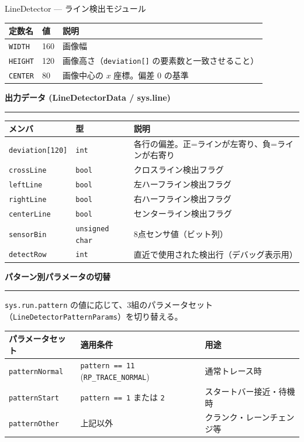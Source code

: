 \documentclass[a4paper,11pt,dvipdfmx]{jsarticle}
\makeatletter
\newcommand{\apisection}[1]{%
  \par\addvspace{4mm}%
  {\normalsize\bfseries\color{headerblue} #1}%
  \par\vspace{-1mm}%
  {\color{accentblue!40}\rule{\linewidth}{0.5pt}}%
  \par\nobreak\vspace{2mm}%
  \@afterheading
}
\makeatother
\begin{document}
\begin{apibox}{LineDetector --- ライン検出モジュール}
\begin{tabularx}{\textwidth}{l l X}
\toprule
\textbf{定数名} & \textbf{値} & \textbf{説明} \\
\midrule
\texttt{WIDTH}  & 160 & 画像幅 \\
\texttt{HEIGHT} & 120 & 画像高さ（\texttt{deviation[]} の要素数と一致させること） \\
\texttt{CENTER} & 80  & 画像中心の $x$ 座標。偏差 0 の基準 \\
\bottomrule
\end{tabularx}

\apisection{出力データ (LineDetectorData / sys.line)}

\begin{tabularx}{\textwidth}{l l X}
\toprule
\textbf{メンバ} & \textbf{型} & \textbf{説明} \\
\midrule
\texttt{deviation[120]} & \texttt{int}  & 各行の偏差。正=ラインが左寄り、負=ラインが右寄り \\
\texttt{crossLine}   & \texttt{bool} & クロスライン検出フラグ \\
\texttt{leftLine}    & \texttt{bool} & 左ハーフライン検出フラグ \\
\texttt{rightLine}   & \texttt{bool} & 右ハーフライン検出フラグ \\
\texttt{centerLine}  & \texttt{bool} & センターライン検出フラグ \\
\texttt{sensorBin}   & \texttt{unsigned char} & 8点センサ値（ビット列） \\
\texttt{detectRow}   & \texttt{int}  & 直近で使用された検出行（デバッグ表示用） \\
\bottomrule
\end{tabularx}

\apisection{パターン別パラメータの切替}

\texttt{sys.run.pattern} の値に応じて、3組のパラメータセット
（\texttt{LineDetectorPatternParams}）を切り替える。

\begin{tabularx}{\textwidth}{l l X}
\toprule
\textbf{パラメータセット} & \textbf{適用条件} & \textbf{用途} \\
\midrule
\texttt{patternNormal} & \texttt{pattern == 11} (\texttt{RP\_TRACE\_NORMAL}) & 通常トレース時 \\
\texttt{patternStart}  & \texttt{pattern == 1} または \texttt{2} & スタートバー接近・待機時 \\
\texttt{patternOther}  & 上記以外 & クランク・レーンチェンジ等 \\
\bottomrule
\end{tabularx}


\end{apibox}
\end{document}
